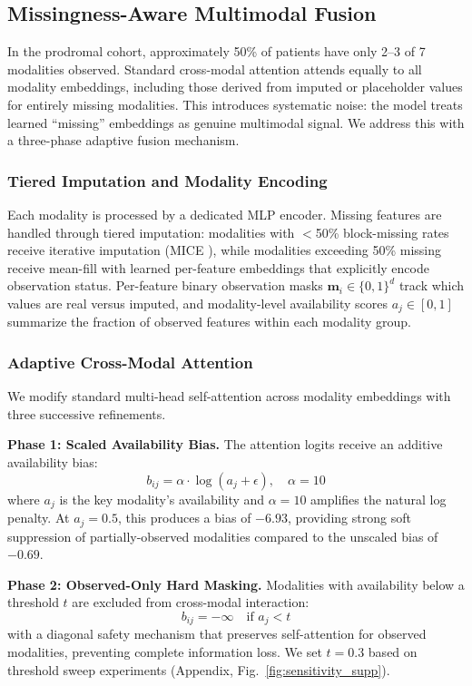 \documentclass[journal,twoside,web]{ieeecolor}
\begin{document}
\subsection{Missingness-Aware Multimodal Fusion}
\label{sec:fusion}
In the prodromal cohort, approximately 50\% of patients have only 2--3 of 7 modalities observed. Standard cross-modal attention attends equally to all modality embeddings, including those derived from imputed or placeholder values for entirely missing modalities. This introduces systematic noise: the model treats learned ``missing'' embeddings as genuine multimodal signal. We address this with a three-phase adaptive fusion mechanism.

\subsubsection{Tiered Imputation and Modality Encoding}
Each modality is processed by a dedicated MLP encoder. Missing features are handled through tiered imputation: modalities with $<$50\% block-missing rates receive iterative imputation (MICE \cite{vanbuuren2011mice}), while modalities exceeding 50\% missing receive mean-fill with learned per-feature embeddings that explicitly encode observation status. Per-feature binary observation masks $\mathbf{m}_i \in \{0,1\}^d$ track which values are real versus imputed, and modality-level availability scores $a_j \in [0,1]$ summarize the fraction of observed features within each modality group.

\subsubsection{Adaptive Cross-Modal Attention}
We modify standard multi-head self-attention across modality embeddings with three successive refinements.

\textbf{Phase 1: Scaled Availability Bias.} The attention logits receive an additive availability bias:
\begin{equation}
b_{ij} = \alpha \cdot \log(a_j + \epsilon), \quad \alpha = 10
\end{equation}
where $a_j$ is the key modality's availability and $\alpha=10$ amplifies the natural log penalty. At $a_j=0.5$, this produces a bias of $-6.93$, providing strong soft suppression of partially-observed modalities compared to the unscaled bias of $-0.69$.

\textbf{Phase 2: Observed-Only Hard Masking.} Modalities with availability below a threshold $t$ are excluded from cross-modal interaction:
\begin{equation}
b_{ij} = -\infty \quad \text{if } a_j < t
\end{equation}
with a diagonal safety mechanism that preserves self-attention for observed modalities, preventing complete information loss. We set $t=0.3$ based on threshold sweep experiments (Appendix, Fig.~\ref{fig:sensitivity_supp}).
\end{document}
